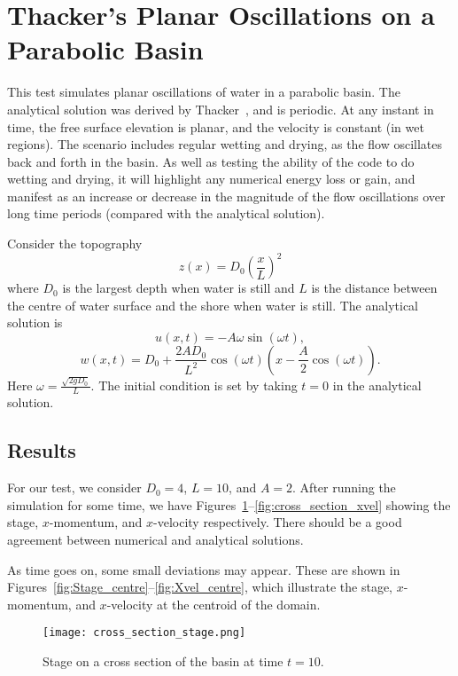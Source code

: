 \section{Thacker's Planar Oscillations on a Parabolic Basin}
This test simulates planar oscillations of water in a parabolic basin. The analytical solution was derived by Thacker~\cite{Thacker1981}, and is periodic. At any instant in time, the free surface elevation is planar, and the velocity is constant (in wet regions). The scenario includes regular wetting and drying, as the flow oscillates back and forth in the basin. As well as testing the ability of the code to do wetting and drying, it will highlight any numerical energy loss or gain, and manifest as an increase or decrease in the magnitude of the flow oscillations over long time periods (compared with the analytical solution). 

Consider the topography
\begin{equation}
z(x) = D_0 \left(\frac{x}{L}\right)^2
\end{equation}
where $D_0$ is the largest depth when water is still and $L$ is the distance between the centre of water surface and the shore when water is still.
The analytical solution is 
\begin{equation}
u(x,t) = -A \omega \sin(\omega t),
\end{equation}
\begin{equation}
w(x,t) = D_0 + \frac{2 A D_0}{L^2} \cos(\omega t) \left( x - \frac{A}{2}\cos(\omega t) \right).
\end{equation}
Here $\omega=\frac{\sqrt{2 g D_0}}{L}$.
The initial condition is set by taking $t=0$ in the analytical solution.


\subsection{Results}
For our test, we consider $D_0=4$, $L=10$, and $A=2$. After running the simulation for some time, we have Figures~\ref{fig:cross_section_stage}--\ref{fig:cross_section_xvel} showing the stage, $x$-momentum, and $x$-velocity respectively. There should be a good agreement between numerical and analytical solutions.

As time goes on, some small deviations may appear. These are shown in Figures~\ref{fig:Stage_centre}--\ref{fig:Xvel_centre}, which illustrate the stage, $x$-momentum, and $x$-velocity at the centroid of the domain.

\begin{figure}
\begin{center}
\texttt{[image: cross\_section\_stage.png]}
\caption{Stage on a cross section of the basin at time $t=10$.}
\label{fig:cross_section_stage}
\end{center}
\end{figure}


